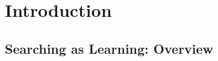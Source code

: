 \documentclass[letterpaper, nobind]{templates/ociamthesis}
\begin{document}
\begin{romanpages}



\dominitoc %

\flushbottom

\tableofcontents

\listoffigures
	\mtcaddchapter


\end{romanpages}

\flushbottom

\hypertarget{introduction}{%
\chapter{Introduction}\label{introduction}}

\hypertarget{sec-intro-overview}{%
\section{Searching as Learning: Overview}\label{sec-intro-overview}}
\end{document}

